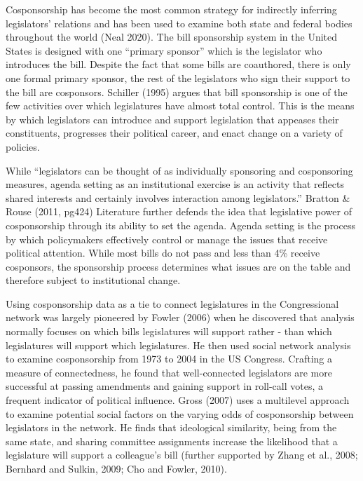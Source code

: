 \documentclass[Royal,times,sageh]{sagej}
\begin{document}
Cosponsorship has become the most common strategy for indirectly inferring legislators' relations and has been used to examine both state and federal bodies throughout the world (Neal 2020). The bill sponsorship system in the United States is designed with one ``primary sponsor'' which is the legislator who introduces the bill. Despite the fact that some bills are coauthored, there is only one formal primary sponsor, the rest of the legislators who sign their support to the bill are cosponsors. Schiller (1995) argues that bill sponsorship is one of the few activities over which legislatures have almost total control. This is the means by which legislators can introduce and support legislation that appeases their constituents, progresses their political career, and enact change on a variety of policies.

While ``legislators can be thought of as individually sponsoring and cosponsoring measures, agenda setting as an institutional exercise is an activity that reflects shared interests and certainly involves interaction among legislators.'' Bratton \& Rouse (2011, pg424) Literature further defends the idea that legislative power of cosponsorship through its ability to set the agenda. Agenda setting is the process by which policymakers effectively control or manage the issues that receive political attention. While most bills do not pass and less than 4\% receive cosponsors, the sponsorship process determines what issues are on the table and therefore subject to institutional change.

Using cosponsorship data as a tie to connect legislatures in the Congressional network was largely pioneered by Fowler (2006) when he discovered that analysis normally focuses on which bills legislatures will support rather - than which legislatures will support which legislatures. He then used social network analysis to examine cosponsorship from 1973 to 2004 in the US Congress. Crafting a measure of connectedness, he found that well-connected legislators are more successful at passing amendments and gaining support in roll-call votes, a frequent indicator of political influence. Gross (2007) uses a multilevel approach to examine potential social factors on the varying odds of cosponsorship between legislators in the network. He finds that ideological similarity, being from the same state, and sharing committee assignments increase the likelihood that a legislature will support a colleague's bill (further supported by Zhang et al., 2008; Bernhard and Sulkin, 2009; Cho and Fowler, 2010).
\end{document}
